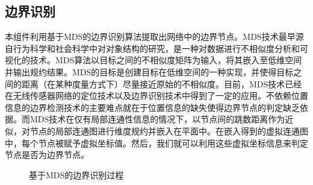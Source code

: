 \subsection{边界识别}
本组件利用基于MDS的边界识别算法提取出网络中的边界节点。MDS技术最早源自行为科学和社会科学中对对象结构的研究，是一种对数据进行不相似度分析和可视化的技术。MDS算法以目标之间的不相似度矩阵为输入，将其嵌入至低维空间并输出规约结果。MDS的目标是创建目标在低维空间的一种实现，并使得目标之间的距离（在某种度量方式下）尽量接近原始的不相似度。目前，MDS技术已经在无线传感器网络的定位技术以及边界识别技术中得到了一定的应用。不依赖位置信息的边界检测技术的主要难点就在于位置信息的缺失使得边界节点的判定缺乏依据。而MDS技术在仅有局部连通性信息的情况下，以节点间的跳数距离作为近似，对节点的局部连通图进行维度规约并嵌入在平面中。在嵌入得到的虚拟连通图中，每个节点被赋予虚拟坐标值。然后，我们就可以利用这些虚拟坐标信息来判定节点是否为边界节点。
\begin{figure}[t]
  \centering
  \hspace{0.25em}%
  \hspace{0.25em}%
  \hspace{0.25em}%
  \hspace{0.25em}%
  \hspace{0.25em}%
  \caption{基于MDS的边界识别过程}
  \label{fig:302}
\end{figure}

